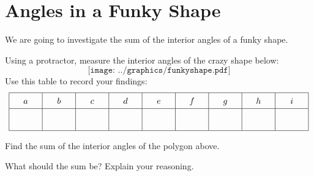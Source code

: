 \newpage
\section{Angles in a Funky Shape} 

We are going to investigate the sum of the interior angles of a
funky shape.

\begin{prob}
Using a protractor, measure the interior angles of the crazy shape below:
\[
\texttt{[image: ../graphics/funkyshape.pdf]}
\]
Use this table to record your findings:
\[
{\renewcommand{\arraystretch}{1.5}
\begin{array}{|c|c|c|c|c|c|c|c|c|}\hline
a & b & c & d & e & f & g & h & i \\\hline
\rule[7mm]{10mm}{0mm}  & \rule[7mm]{10mm}{0mm}    & \rule[7mm]{10mm}{0mm}   & \rule[7mm]{10mm}{0mm}   &  \rule[7mm]{10mm}{0mm}   & \rule[7mm]{10mm}{0mm}    & \rule[7mm]{10mm}{0mm}   & \rule[7mm]{10mm}{0mm}   & \rule[7mm]{10mm}{0mm}   \\ \hline
\end{array}}
\]
\end{prob}

\begin{prob}
Find the sum of the interior angles of the polygon above. 
\end{prob}


\begin{prob}
What should the sum be? Explain your reasoning. 
\end{prob}


